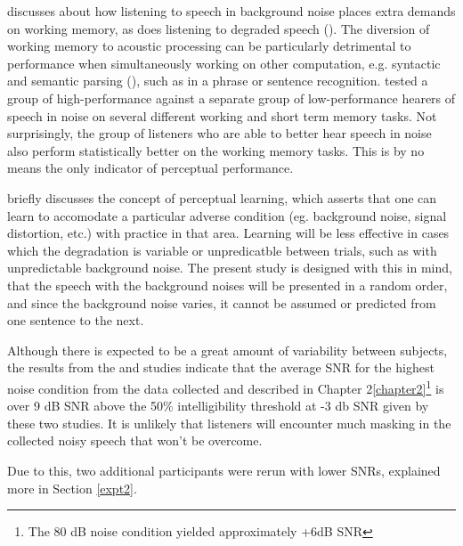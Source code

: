 \documentclass[dissertation,copyright]{uathesis}
\begin{document}
\cite{francis:10} discusses about how listening to speech in background noise places extra demands on working memory, as does listening to degraded speech (\cite{francis:09}).  The diversion of working memory to acoustic processing can be particularly detrimental to performance when simultaneously working on other computation, e.g. syntactic and semantic parsing (\cite{caplan:99}), such as in a phrase or sentence recognition. \cite{tamati:13} tested a group of high-performance against a separate group of low-performance hearers of speech in noise on several different working and short term memory tasks.  Not surprisingly, the group of listeners who are able to better hear speech in noise also perform statistically better on the working memory tasks.  This is by no means the only indicator of perceptual performance.

\cite{mattys:12} briefly discusses the concept of perceptual learning, which asserts that one can learn to accomodate a particular adverse condition (eg. background noise, signal distortion, etc.) with practice in that area.  Learning will be less effective in cases which the degradation is variable or unpredicatble between trials, such as with unpredictable background noise.  The present study is designed with this in mind, that the speech with the background noises will be presented in a random order, and since the background noise varies, it cannot be assumed or predicted from one sentence to the next.

Although there is expected to be a great amount of variability between subjects, the results from the \cite{ding:13} and \cite{gilbert:13} studies indicate that the average SNR for the highest noise condition from the data collected and described in Chapter 2\ref{chapter2}\footnote{The 80 dB noise condition yielded approximately +6dB SNR} is over 9 dB SNR above the 50\% intelligibility threshold at -3 db SNR given by these two studies.  It is unlikely that listeners will encounter much masking in the collected noisy speech that won't be overcome.

Due to this, two additional participants were rerun with lower SNRs, explained more in Section \ref{expt2}.


\end{document}
